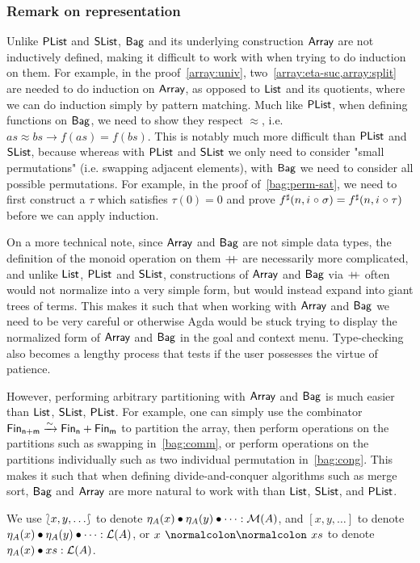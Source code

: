 \subsubsection*{Remark on representation}\label{bag:rep}

Unlike $\operatorname{\mathsf{PList}}$ and $\operatorname{\mathsf{SList}}$, $\operatorname{\mathsf{Bag}}$ and its underlying construction $\operatorname{\mathsf{Array}}$ are not inductively defined,
making it difficult to work with when trying to do induction on them. For example,
in the proof~\cref{array:univ}, two~\cref{array:eta-suc,array:split} are needed to do
induction on $\operatorname{\mathsf{Array}}$, as opposed to $\operatorname{\mathsf{List}}$ and its quotients, where we can do induction simply by
pattern matching. Much like $\operatorname{\mathsf{PList}}$, when defining functions on $\operatorname{\mathsf{Bag}}$, we need to show they respect
$\approx$, i.e. $as \approx bs \to f(as) = f(bs)$. This is notably much more difficult than
$\operatorname{\mathsf{PList}}$ and $\operatorname{\mathsf{SList}}$, because whereas with $\operatorname{\mathsf{PList}}$ and $\operatorname{\mathsf{SList}}$ we only need to consider "small permutations"
(i.e. swapping adjacent elements), with $\operatorname{\mathsf{Bag}}$ we need to consider all possible permutations. For example,
in the proof of~\cref{bag:perm-sat}, we need to first construct a $\tau$ which satisfies $\tau(0) = 0$ and prove
${f}^{\sharp}(n, i \mathrel{\circ} \sigma) = {f}^{\sharp}(n, i \mathrel{\circ} \tau)$ before we can apply induction.

\begin{toappendix}
    On a more technical note, since $\operatorname{\mathsf{Array}}$ and $\operatorname{\mathsf{Bag}}$ are not simple data types, the definition of
    the monoid operation on them $\mathbin{+\kern -0.4em+}$ are necessarily more complicated, and unlike $\operatorname{\mathsf{List}}$, $\operatorname{\mathsf{PList}}$
    and $\operatorname{\mathsf{SList}}$, constructions of $\operatorname{\mathsf{Array}}$ and $\operatorname{\mathsf{Bag}}$ via $\mathbin{+\kern -0.4em+}$ often would not normalize into a
    very simple form, but would instead expand into giant trees of terms. This makes it such that when working
    with $\operatorname{\mathsf{Array}}$ and $\operatorname{\mathsf{Bag}}$ we need to be very careful or otherwise Agda would be stuck trying to display
    the normalized form of $\operatorname{\mathsf{Array}}$ and $\operatorname{\mathsf{Bag}}$ in the goal and context menu. Type-checking also becomes a lengthy
    process that tests if the user possesses the virtue of patience.

    However, performing arbitrary partitioning with $\operatorname{\mathsf{Array}}$ and $\operatorname{\mathsf{Bag}}$ is much easier than
    $\operatorname{\mathsf{List}}$, $\operatorname{\mathsf{SList}}$, $\operatorname{\mathsf{PList}}$. For example,
    one can simply use the combinator ${\Fin[n+m] \xto{\sim} \Fin[n] + \Fin[m]}$ to partition the array,
    then perform operations on the partitions such as swapping in~\cref{bag:comm},
    or perform operations on the partitions individually such as two individual permutation in~\cref{bag:cong}.
    This makes it such that when defining divide-and-conquer algorithms such as merge sort,
    $\operatorname{\mathsf{Bag}}$ and $\operatorname{\mathsf{Array}}$ are more natural to work with than $\operatorname{\mathsf{List}}$, $\operatorname{\mathsf{SList}}$, and $\operatorname{\mathsf{PList}}$.

    We use ${\lbag}{x,y,\dots}{\rbag}$ to denote $\eta_A(x) \mathbin{\bullet} \eta_A(y) \mathbin{\bullet} \dots : \mathcal{M}(A)$,
    and $[x, y, \dots]$ to denote $\eta_A(x) \mathbin{\bullet} \eta_A(y) \mathbin{\bullet} \dots : \mathcal{L}(A)$,
    or $x \cons xs$ to denote $\eta_A(x) \mathbin{\bullet} xs : \mathcal{L}(A)$.
\end{toappendix}
